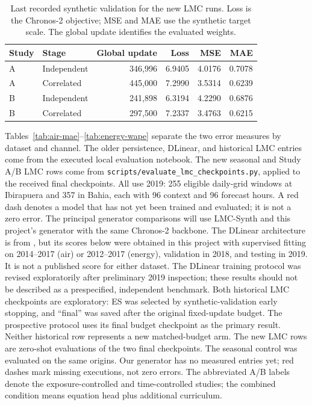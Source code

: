 \begin{table}[H]
\centering\small
\caption{Last recorded synthetic validation for the new LMC runs. Loss is
the Chronos-2 objective; MSE and MAE use the synthetic target scale. The
global update identifies the evaluated weights.}
\label{tab:lmc-new-synthetic-validation}
\begin{tabular}{llrrrr}\toprule
Study & Stage & Global update & Loss & MSE & MAE \\\midrule
A & Independent & 346,996 & 6.9405 & 4.0176 & 0.7078 \\
A & Correlated & 445,000 & 7.2990 & 3.5314 & 0.6239 \\
B & Independent & 241,898 & 6.3194 & 4.2290 & 0.6876 \\
B & Correlated & 297,500 & 7.2337 & 3.4763 & 0.6215 \\\bottomrule
\end{tabular}
\end{table}

Tables~\ref{tab:air-mae}--\ref{tab:energy-wape} separate the two error
measures by dataset and channel. The older persistence, DLinear, and
historical LMC entries come from the executed local evaluation notebook.
The new seasonal and Study A/B LMC rows come from
\texttt{scripts/evaluate\_lmc\_checkpoints.py}, applied to the received final
checkpoints. All use 2019: 255 eligible daily-grid windows at Ibirapuera and
357 in Bahia,
each with 96 context and 96 forecast hours. A red dash denotes a model that has
not yet been trained and evaluated; it is not a zero error. The principal
generator comparisons will use LMC-Synth and this project's generator with
the same Chronos-2 backbone. The DLinear architecture is from
\citet{zeng2023transformers}, but its scores below were obtained in this
project with supervised fitting on 2014--2017 (air) or 2012--2017 (energy),
validation in 2018, and testing in 2019. It is not a published score for
either dataset. The DLinear training protocol was revised exploratorily after
preliminary 2019 inspection; these results should not be described as a
prespecified, independent benchmark. Both historical LMC checkpoints are
exploratory: ES was selected by synthetic-validation early stopping, and
``final'' was saved after the original fixed-update budget. The prospective
protocol uses its final budget checkpoint as the primary result. Neither
historical row represents a new matched-budget arm. The new LMC rows are
zero-shot evaluations of the two final checkpoints. The seasonal control
was evaluated on the same origins. Our generator has no measured entries
yet; red dashes mark missing executions, not zero errors. The abbreviated A/B
labels denote the exposure-controlled and time-controlled studies; the
combined condition means equation head plus additional curriculum.

